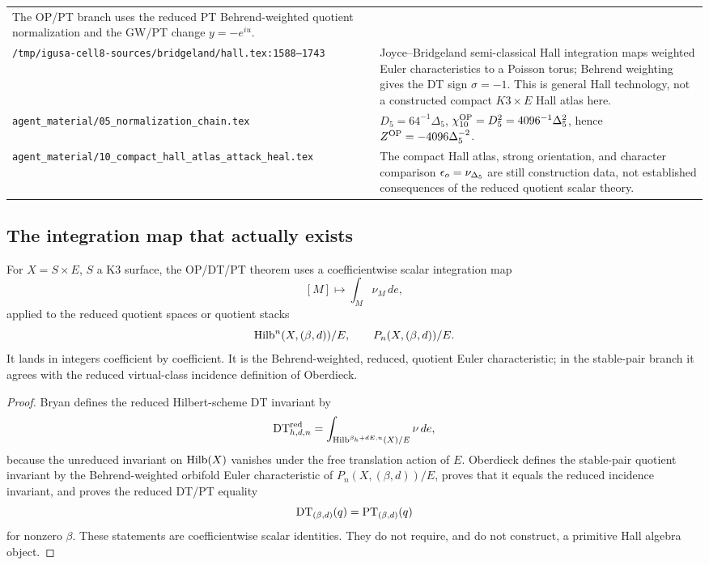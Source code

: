 \begin{center}
\begin{tabular}{p{}p{}}
The OP/PT branch uses the reduced PT Behrend-weighted quotient
normalization and the GW/PT change \(y=-e^{iu}\). \\
\texttt{/tmp/igusa-cell8-sources/bridgeland/hall.tex:1588--1743} &
Joyce--Bridgeland semi-classical Hall integration maps weighted Euler
characteristics to a Poisson torus; Behrend weighting gives the DT sign
\(\sigma=-1\).  This is general Hall technology, not a constructed
compact \(K3\times E\) Hall atlas here. \\
\texttt{agent\_material/05\_normalization\_chain.tex} &
\(D_5=64^{-1}\Delta_5\),
\(\chi_{10}^{\mathrm{OP}}=D_5^2=4096^{-1}\Delta_5^2\), hence
\(Z^{\mathrm{OP}}=-4096\Delta_5^{-2}\). \\
\texttt{agent\_material/10\_compact\_hall\_atlas\_attack\_heal.tex} &
The compact Hall atlas, strong orientation, and character comparison
\(\epsilon_o=\nu_{\Delta_5}\) are still construction data, not established
consequences of the reduced quotient scalar theory. \\
\hline
\end{tabular}
\end{center}

\subsection{The integration map that actually exists}

\begin{proposition}
\label{prop:reduced-scalar-integration-only}
For \(X=S\times E\), \(S\) a K3 surface, the OP/DT/PT theorem uses a
coefficientwise scalar integration map
\[
  [M]\longmapsto \int_M \nu_M\,de,
\]
applied to the reduced quotient spaces or quotient stacks
\[
  \operatorname{Hilb}^n(X,(\beta,d))/E,
  \qquad
  P_n(X,(\beta,d))/E.
\]
It lands in integers coefficient by coefficient.  It is the
Behrend-weighted, reduced, quotient Euler characteristic; in the
stable-pair branch it agrees with the reduced virtual-class incidence
definition of Oberdieck.
\end{proposition}

\begin{proof}
Bryan defines the reduced Hilbert-scheme DT invariant by
\[
  \mathrm{DT}_{h,d,n}^{\mathrm{red}}
  =
  \int_{\operatorname{Hilb}^{\beta_h+dE,n}(X)/E}\nu\,de,
\]
because the unreduced invariant on \(\operatorname{Hilb}(X)\) vanishes under the free
translation action of \(E\).  Oberdieck defines the stable-pair quotient
invariant by the Behrend-weighted orbifold Euler characteristic of
\(P_n(X,(\beta,d))/E\), proves that it equals the reduced incidence
invariant, and proves the reduced DT/PT equality
\[
  \mathrm{DT}_{(\beta,d)}(q)=\mathrm{PT}_{(\beta,d)}(q)
\]
for nonzero \(\beta\).  These statements are coefficientwise scalar
identities.  They do not require, and do not construct, a primitive
Hall algebra object.
\end{proof}

